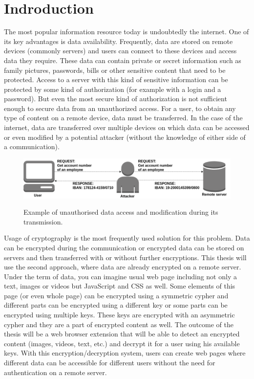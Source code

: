 \chapter{Indroduction}
The most popular information resource today is undoubtedly the internet. One of its key advantages is data availability. Frequently, data are stored on remote devices (commonly servers) and users can connect to these devices and access data they require. These data can contain private or secret information such as family pictures, passwords, bills or other sensitive content that need to be protected. Access to a server with this kind of sensitive information can be protected by some kind of authorization (for example with a login and a password). But even the most secure kind of authorization is not sufficient enough to secure data from an unauthorized access. For a user, to obtain any type of content on a remote device, data must be transferred. In the case of the internet, data are transferred over multiple devices on which data can be accessed or even modified by a potential attacker (without the knowledge of either side of a communication).

\begin{figure}[H]
    \begin{center}
        \label{img:unsecureConnection}
        \includegraphics[width=1.0\textwidth]{obrazky-figures/unsecureconnection.png}
        \caption{Example of unauthorised data access and modification during its transmission.}
    \end{center}
\end{figure}

Usage of cryptography is the most frequently used solution for this problem. Data can be encrypted during the communication or encrypted data can be stored on servers and then transferred with or without further encryptions. This thesis will use the second approach, where data are already encrypted on a remote server. Under the term of data, you can imagine usual web page including not only a text, images or videos but JavaScript and CSS as well. Some elements of this page (or even whole page) can be encrypted using a symmetric cypher and different parts can be encrypted using a different key or some parts can be encrypted using multiple keys. These keys are encrypted with an asymmetric cypher and they are a part of encrypted content as well. The outcome of the thesis will be a web browser extension that will be able to detect an encrypted content (images, videos, text, etc.) and decrypt it for a user using his available keys. With this encryption/decryption system, users can create web pages where different data can be accessible for different users without the need for authentication on a remote server.

